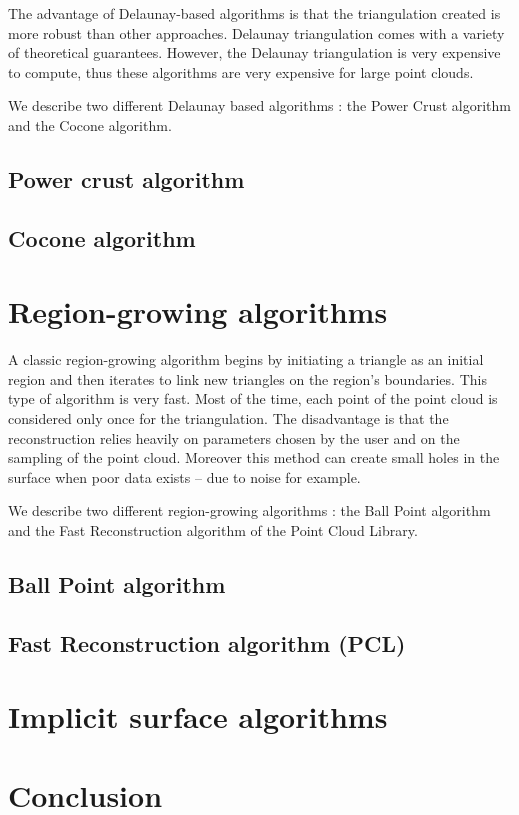 \documentclass[a4paper]{article}
\begin{document}
The advantage of Delaunay-based algorithms is that the triangulation created is more robust than other approaches. Delaunay triangulation comes with a variety of theoretical guarantees. However, the Delaunay triangulation is very expensive to compute, thus these algorithms are very expensive for large point clouds.

We describe two different Delaunay based algorithms : the Power Crust algorithm and the Cocone algorithm.
\subsection{Power crust algorithm}

\subsection{Cocone algorithm}

\section{Region-growing algorithms}
A classic region-growing algorithm begins by initiating a triangle as an initial region and then iterates to link new triangles on the region's boundaries. This type of algorithm is very fast. Most of the time, each point of the point cloud is considered only once for the triangulation. The disadvantage is that the reconstruction relies heavily on parameters chosen by the user and on the sampling of the point cloud. Moreover this method can create small holes in the surface when poor data  exists -- due to noise for example. 

We describe two different region-growing algorithms : the Ball Point algorithm and the Fast Reconstruction algorithm of the Point Cloud Library.

\subsection{Ball Point algorithm}

\subsection{Fast Reconstruction algorithm (PCL)}


\section{Implicit surface algorithms}


\section{Conclusion}
\end{document}

